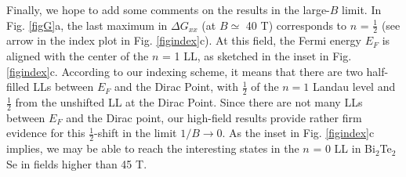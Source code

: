Finally, we hope to add some comments on the results in the large-$B$ limit.
In Fig. \ref{figG}a, the last maximum in $\Delta G_{xx}$ (at $B\simeq$ 40 T) corresponds to
$n$ = $\frac12$ (see arrow in the index plot in Fig. \ref{figindex}c). At this field, the
Fermi energy $E_F$ is aligned with the center of the $n$ = 1 LL, as sketched in the
inset in Fig. \ref{figindex}c. According to our indexing scheme, it means that there are two half-filled
LLs between $E_F$ and the Dirac Point, with $\frac12$ of the $n=1$ Landau level and $\frac12$ 
from the unshifted LL at the Dirac Point. Since there are not many LLs between $E_F$ and the Dirac point, our high-field results provide 
rather firm evidence 
for this $\frac12$-shift in the limit $1/B\to 0$. 
As the inset in Fig. \ref{figindex}c implies, we may be able to reach the interesting
states in the $n$ = 0 LL in Bi$_2$Te$_2$Se in fields higher than 45 T. 
